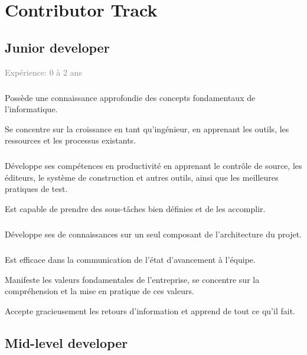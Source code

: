 \documentclass[a4paper, french, openany, 12pt]{book}
\newcommand\dex{\textcolor{BrickRed}{\textbf{\bsc{Dex}}}}
\newcommand\str{\textcolor{DarkOrchid}{\textbf{\bsc{Str}}}}
\newcommand\wis{\textcolor{MidnightBlue}{\textbf{\bsc{Wis}}}}
\newcommand\cha{\textcolor{RawSienna}{\textbf{\bsc{Cha}}}}
\newcommand\xp[1]{\textcolor{Gray}{Expérience: {#1} ans}}
\begin{document}
\part{Contributor Track}

\chapter{Junior developer}

\xp{0 à 2}

\subsubsection*{\dex} 

Possède une connaissance approfondie des concepts fondamentaux de l'informatique.

Se concentre sur la croissance en tant qu'ingénieur, en apprenant les outils, les ressources et les processus existants.

\subsubsection*{\str}

Développe ses compétences en productivité en apprenant le contrôle de source, les éditeurs, le système de construction 
et autres outils, ainsi que les meilleures pratiques de test.

Est capable de prendre des sous-tâches bien définies et de les accomplir.

\subsubsection*{\wis}

Développe ses de connaissances sur un seul composant de l'architecture du projet.

\subsubsection*{\cha}

Est efficace dans la communication de l'état d'avancement à l'équipe.

Manifeste les valeurs fondamentales de l'entreprise, se concentre sur la compréhension et la mise en pratique de ces 
valeurs.

Accepte gracieusement les retours d'information et apprend de tout ce qu'il fait.

\chapter{Mid-level developer}
\end{document}
